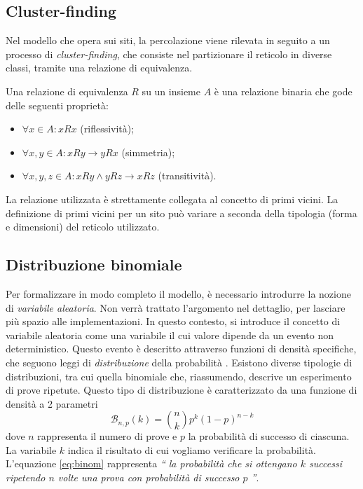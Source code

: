 \subsection*{Cluster-finding}
Nel modello che opera sui siti, la percolazione viene rilevata in seguito a un processo 
di \textit{cluster-finding}, che consiste nel partizionare il reticolo in diverse 
classi, tramite una relazione di equivalenza. 
\begin{definition}
Una relazione di equivalenza $R$ su un insieme $A$ è una relazione binaria 
che gode delle seguenti proprietà:
\begin{itemize}
    \item $\forall x \in A : xRx$ (riflessività);
    \item $\forall x,y \in A : xRy \rightarrow yRx$ (simmetria);
    \item $\forall x,y,z \in A: xRy \wedge yRz \rightarrow xRz$ (transitività).
\end{itemize}
\end{definition}
La relazione utilizzata è strettamente collegata al concetto di primi vicini.
La definizione di primi vicini per un sito può variare a seconda della tipologia
(forma e dimensioni) del reticolo utilizzato.

\subsection*{Distribuzione binomiale}
Per formalizzare in modo completo il modello, è necessario introdurre 
la nozione di \textit{variabile aleatoria}. Non verrà trattato l'argomento 
nel dettaglio, per lasciare più spazio alle implementazioni.
In questo contesto, si introduce il concetto di variabile aleatoria come 
una variabile il cui valore dipende da un evento non deterministico.
Questo evento è descritto attraverso funzioni di densità specifiche, che seguono 
leggi di \textit{distribuzione} della probabilità \cite{random}. Esistono diverse 
tipologie di distribuzioni, tra cui quella binomiale che, riassumendo, descrive 
un esperimento di prove ripetute.
Questo tipo di distribuzione è caratterizzato da una funzione di densità 
a 2 parametri
\begin{equation}
    \mathcal{B}_{n, p}(k) = \binom{n}{k} p^k (1-p)^{n-k}
\end{equation}
\label{eq:binom}
dove $n$ rappresenta il numero di prove e $p$ la probabilità di successo di ciascuna.
La variabile $k$ indica il risultato di cui vogliamo verificare la probabilità.
L'equazione \ref{eq:binom} rappresenta \textit{`` la probabilità che si ottengano $k$ successi
ripetendo $n$ volte una prova con probabilità di successo $p$ ''}.